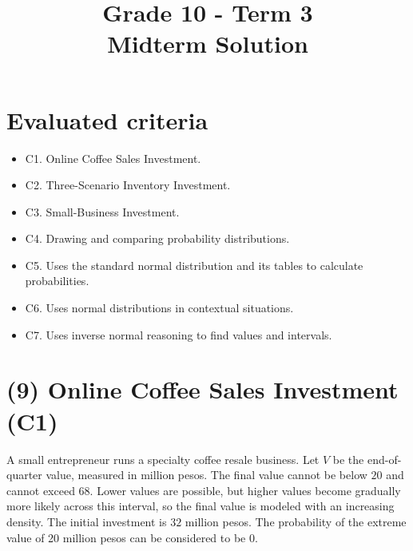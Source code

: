 \makeatletter
{}
\makeatother






\title{Grade 10 - Term 3 \\ Midterm Solution}
\author{}
\date{}


	\maketitle
	
	\setcounter{tocdepth}{1}
	\setcounter{secnumdepth}{2}
	\label{toc}
	\tableofcontents
	
	\section*{Evaluated criteria}
	\begin{itemize}
		\item C1. Online Coffee Sales Investment.
		\item C2. Three-Scenario Inventory Investment.
		\item C3. Small-Business Investment.
		\item C4. Drawing and comparing probability distributions.
		\item C5. Uses the standard normal distribution and its tables to calculate probabilities.
		\item C6. Uses normal distributions in contextual situations.
		\item C7. Uses inverse normal reasoning to find values and intervals.
	\end{itemize}
	
	\section{(9) Online Coffee Sales Investment (C1)}
	\label{sec:online-coffee-sales-investment-c1}
	
	A small entrepreneur runs a specialty coffee resale business. Let $V$ be the end-of-quarter value, measured in million pesos. The final value cannot be below $20$ and cannot exceed $68$. Lower values are possible, but higher values become gradually more likely across this interval, so the final value is modeled with an increasing density. The initial investment is $32$ million pesos. The probability of the extreme value of 20 million pesos can be considered to be 0.
	
